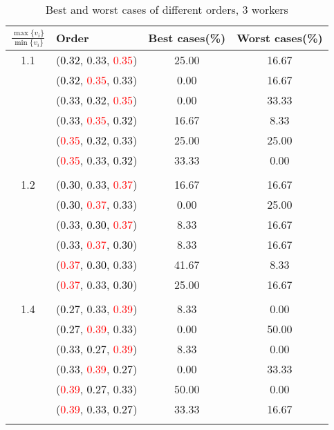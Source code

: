 \documentclass[10pt,a4paper]{report}
\begin{document}
\newpage\begin{center}
	\small
	\begin{longtable}{clcc}
		\caption{Best and worst cases of different orders, 3 workers}\\
		\toprule
		\setlength{\tabcolsep}{1mm}
		\renewcommand\baselinestretch{0.5}\selectfont
		$\frac{\max\{v_i\}}{\min\{v_i\}}$ & Order & Best cases(\%) & Worst cases(\%) \\
			\midrule		1.1			&(\textcolor{black}{0.32}, 0.33, \textcolor{red}{0.35})&25.00&16.67\\
			&(\textcolor{black}{0.32}, \textcolor{red}{0.35}, 0.33)&0.00&16.67\\
			&(0.33, \textcolor{black}{0.32}, \textcolor{red}{0.35})&0.00&33.33\\
			&(0.33, \textcolor{red}{0.35}, \textcolor{black}{0.32})&16.67&8.33\\
			&(\textcolor{red}{0.35}, \textcolor{black}{0.32}, 0.33)&25.00&25.00\\
			&(\textcolor{red}{0.35}, 0.33, \textcolor{black}{0.32})&33.33&0.00\\
		&&&\\
		1.2			&(\textcolor{black}{0.30}, 0.33, \textcolor{red}{0.37})&16.67&16.67\\
			&(\textcolor{black}{0.30}, \textcolor{red}{0.37}, 0.33)&0.00&25.00\\
			&(0.33, \textcolor{black}{0.30}, \textcolor{red}{0.37})&8.33&16.67\\
			&(0.33, \textcolor{red}{0.37}, \textcolor{black}{0.30})&8.33&16.67\\
			&(\textcolor{red}{0.37}, \textcolor{black}{0.30}, 0.33)&41.67&8.33\\
			&(\textcolor{red}{0.37}, 0.33, \textcolor{black}{0.30})&25.00&16.67\\
		&&&\\
		1.4			&(\textcolor{black}{0.27}, 0.33, \textcolor{red}{0.39})&8.33&0.00\\
			&(\textcolor{black}{0.27}, \textcolor{red}{0.39}, 0.33)&0.00&50.00\\
			&(0.33, \textcolor{black}{0.27}, \textcolor{red}{0.39})&8.33&0.00\\
			&(0.33, \textcolor{red}{0.39}, \textcolor{black}{0.27})&0.00&33.33\\
			&(\textcolor{red}{0.39}, \textcolor{black}{0.27}, 0.33)&50.00&0.00\\
			&(\textcolor{red}{0.39}, 0.33, \textcolor{black}{0.27})&33.33&16.67\\
		&&&\\

\end{longtable}
\end{center}
\end{document}
